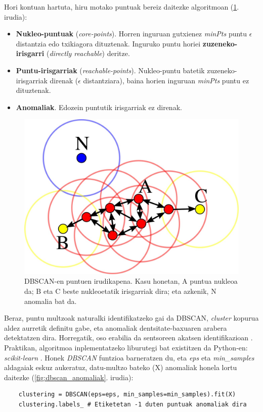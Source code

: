 \documentclass[12pt]{article}
\numberwithin{figure}{section}
\numberwithin{equation}{section}
\begin{document}
Hori kontuan hartuta, hiru motako puntuak bereiz daitezke algoritmoan (\ref{fig:dbscan_points}. irudia):

\begin{itemize}
    \item \textbf{Nukleo-puntuak} (\textit{core-points}). Horren inguruan gutxienez \textit{minPts} puntu $\epsilon$ distantzia edo txikiagora dituztenak. Inguruko puntu horiei \textbf{zuzeneko-irisgarri} (\textit{directly reachable}) deritze.
    \item \textbf{Puntu-irisgarriak} (\textit{reachable-points}). Nukleo-puntu batetik zuzeneko-irisgarriak direnak ($\epsilon$ distantziara), baina horien inguruan \textit{minPts} puntu ez dituztenak.
    \item \textbf{Anomaliak}. Edozein puntutik irisgarriak ez direnak.
\end{itemize}

\begin{figure}[h]
    \centering
    \includegraphics[width=0.4\linewidth]{4 - Detekzio teknikak/DBSCAN-Illustration.jpg}
    \caption{DBSCAN-en puntuen irudikapena. Kasu honetan, A puntua nukleoa da; B eta C beste nukleoetatik irisgarriak dira; eta azkenik, N anomalia bat da.}
    \label{fig:dbscan_points}
\end{figure}

Beraz, puntu multzoak naturalki identifikatzeko gai da DBSCAN, \textit{cluster} kopurua aldez aurretik definitu gabe, eta anomaliak dentsitate-baxuaren arabera detektatzen dira. Horregatik, oso erabilia da sentsoreen akatsen identifikazioan \cite{doreswamy_fault_2014}.\\


Praktikan, algoritmoa inplementatzeko liburutegi bat existitzen da Python-en: \textit{scikit-learn} \cite{scikit-learn_dbscan_2025}. Honek \textit{DBSCAN} funtzioa barneratzen du, eta \textit{eps} eta \textit{min\_samples} aldagaiak eskuz aukeratuz, datu-multzo bateko (X) anomaliak honela lortu daitezke (\ref{fig:dbscan_anomaliak}. irudia):

\begin{verbatim}
    clustering = DBSCAN(eps=eps, min_samples=min_samples).fit(X)
    clustering.labels_ # Etiketetan -1 duten puntuak anomaliak dira
\end{verbatim}
\end{document}

